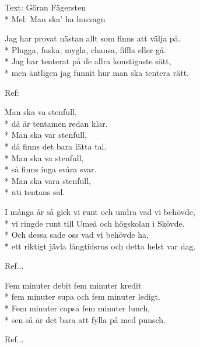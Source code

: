 \begin{SongText}[Tentalåt]
    \begin{SongInfo}
        Text: Göran Fägersten\\*%
        Mel: Man ska’ ha husvagn
    \end{SongInfo}
    \begin{SongVerse}
        Jag har provat nästan allt som finns att välja på.\\*%
        Plugga, fuska, mygla, chansa, fiffla eller gå.\\*%
        Jag har tenterat på de allra konstigaste sätt,\\*%
        men äntligen jag funnit hur man ska tentera rätt.
    \end{SongVerse}
    \begin{SongVerse}
        Ref:
    \end{SongVerse}
    \begin{SongVerse}
        Man ska va stenfull,\\*%
        då är tentamen redan klar.\\*%
        Man ska var stenfull,\\*%
        då finns det bara lätta tal.\\*%
        Man ska va stenfull,\\*%
        så finns inga svåra svar.\\*%
        Man ska vara stenfull,\\*%
        uti tentans sal.
    \end{SongVerse}
    \begin{SongVerse}
        I många år så gick vi runt och undra vad vi behövde,\\*%
        vi ringde runt till Umeå och högskolan i Skövde.\\*%
        Och dessa sade oss vad vi behövde ha,\\*%
        ett riktigt jävla långtidsrus och detta helst var dag.
    \end{SongVerse}
    \begin{SongVerse}
        Ref...
    \end{SongVerse}
    \begin{SongVerse}
        Fem minuter debit fem minuter kredit\\*%
        fem minuter supa och fem minuter ledigt.\\*%
        Fem minuter capsa fem minuter lunch,\\*%
        sen så är det bara att fylla på med punsch.
    \end{SongVerse}
    \begin{SongVerse}
        Ref...
    \end{SongVerse}
\end{SongText}

